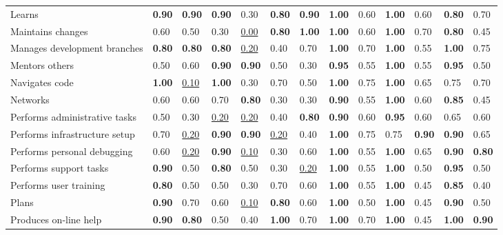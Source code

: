 \begin{tabular}{lllllllllllll}
Learns & \textbf{0.90} & \textbf{0.90} & \textbf{0.90} & 0.30 & \textbf{0.80} & \textbf{0.90} & \textbf{1.00} & 0.60 & \textbf{1.00} & 0.60 & \textbf{0.80} & 0.70 \\
Maintains changes & 0.60 & 0.50 & 0.30 & \underline{0.00} & \textbf{0.80} & \textbf{1.00} & \textbf{1.00} & 0.60 & \textbf{1.00} & 0.70 & \textbf{0.80} & 0.45 \\
Manages development branches & \textbf{0.80} & \textbf{0.80} & \textbf{0.80} & \underline{0.20} & 0.40 & 0.70 & \textbf{1.00} & 0.70 & \textbf{1.00} & 0.55 & \textbf{1.00} & 0.75 \\
Mentors others & 0.50 & 0.60 & \textbf{0.90} & \textbf{0.90} & 0.50 & 0.30 & \textbf{0.95} & 0.55 & \textbf{1.00} & 0.55 & \textbf{0.95} & 0.50 \\
Navigates code & \textbf{1.00} & \underline{0.10} & \textbf{1.00} & 0.30 & 0.70 & 0.50 & \textbf{1.00} & 0.75 & \textbf{1.00} & 0.65 & 0.75 & 0.70 \\
Networks & 0.60 & 0.60 & 0.70 & \textbf{0.80} & 0.30 & 0.30 & \textbf{0.90} & 0.55 & \textbf{1.00} & 0.60 & \textbf{0.85} & 0.45 \\
Performs administrative tasks & 0.50 & 0.30 & \underline{0.20} & \underline{0.20} & 0.40 & \textbf{0.80} & \textbf{0.90} & 0.60 & \textbf{0.95} & 0.60 & 0.65 & 0.60 \\
Performs infrastructure setup & 0.70 & \underline{0.20} & \textbf{0.90} & \textbf{0.90} & \underline{0.20} & 0.40 & \textbf{1.00} & 0.75 & 0.75 & \textbf{0.90} & \textbf{0.90} & 0.65 \\
Performs personal debugging & 0.60 & \underline{0.20} & \textbf{0.90} & \underline{0.10} & 0.30 & 0.60 & \textbf{1.00} & 0.55 & \textbf{1.00} & 0.65 & \textbf{0.90} & \textbf{0.80} \\
Performs support tasks & \textbf{0.90} & 0.50 & \textbf{0.80} & 0.50 & 0.30 & \underline{0.20} & \textbf{1.00} & 0.55 & \textbf{1.00} & 0.50 & \textbf{0.95} & 0.50 \\
Performs user training & \textbf{0.80} & 0.50 & 0.50 & 0.30 & 0.70 & 0.60 & \textbf{1.00} & 0.55 & \textbf{1.00} & 0.45 & \textbf{0.85} & 0.40 \\
Plans & \textbf{0.90} & 0.70 & 0.60 & \underline{0.10} & \textbf{0.80} & 0.60 & \textbf{1.00} & 0.50 & \textbf{1.00} & 0.45 & \textbf{0.90} & 0.50 \\
Produces on-line help & \textbf{0.90} & \textbf{0.80} & 0.50 & 0.40 & \textbf{1.00} & 0.70 & \textbf{1.00} & 0.70 & \textbf{1.00} & 0.45 & \textbf{1.00} & \textbf{0.90} \\

\end{tabular}
